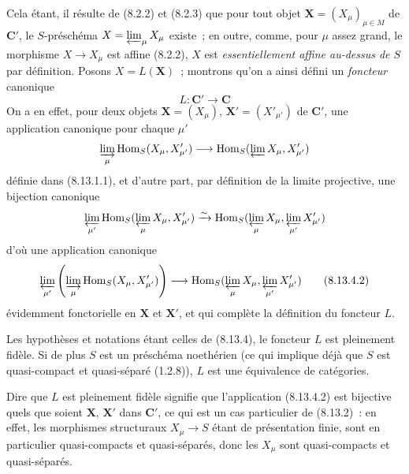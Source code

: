 \begin{env}[8.13.4]
Cela étant, il résulte de (8.2.2) et (8.2.3) que pour tout objet
$\mathbf X=(X_\mu)_{\mu\in M}$ de $\boldsymbol{C}'$, le $S$-préschéma
$X=\varprojlim_\mu X_\mu$ existe~; en outre, comme, pour $\mu$ assez grand,
le morphisme $X\to X_\mu$ est affine (8.2.2), $X$ est
\emph{essentiellement affine au-dessus de $S$} par définition. Posons
$X=L(\mathbf X)$~; montrons qu'on a ainsi défini un \emph{foncteur} canonique
\begin{equation}
\label{IV.8.13.4.1-fr}
L:\boldsymbol{C}'\longrightarrow\boldsymbol{C} \tag{8.13.4.1}
\end{equation}
On a en effet, pour deux objets $\mathbf X=(X_\mu)$,
$\mathbf X'=(X'_{\mu'})$ de $\boldsymbol{C}'$, une application canonique pour
chaque $\mu'$
\[
\varinjlim_\mu\operatorname{Hom}_S(X_\mu,X'_{\mu'})
\longrightarrow
\operatorname{Hom}_S(\varprojlim X_\mu,X'_{\mu'})
\]
définie dans (8.13.1.1), et d'autre part, par définition de la limite
projective, une bijection canonique
\[
\varprojlim_{\mu'}
\operatorname{Hom}_S(\varprojlim_\mu X_\mu,X'_{\mu'})
\xrightarrow{\sim}
\operatorname{Hom}_S(\varprojlim_\mu X_\mu,
\varprojlim_{\mu'}X'_{\mu'})
\]
d'où une application canonique
\begin{equation}
\label{IV.8.13.4.2-fr}
\varprojlim_{\mu'}\left(\varinjlim_\mu
\operatorname{Hom}_S(X_\mu,X'_{\mu'})\right)
\longrightarrow
\operatorname{Hom}_S(\varprojlim_\mu X_\mu,
\varprojlim_{\mu'}X'_{\mu'}) \tag{8.13.4.2}
\end{equation}
évidemment fonctorielle en $\mathbf X$ et $\mathbf X'$, et qui complète la
définition du foncteur $L$.
\end{env}

\begin{proposition}[8.13.5]
\label{IV.8.13.5-fr}
Les hypothèses et notations étant celles de \textup{(8.13.4)}, le foncteur $L$ est
pleinement fidèle. Si de plus $S$ est un préschéma noethérien \textup{(ce qui implique
déjà que $S$ est quasi-compact et quasi-séparé (1.2.8))}, $L$ est une
équivalence de catégories.
\end{proposition}

Dire que $L$ est pleinement fidèle signifie que l'application (8.13.4.2) est
bijective quels que soient $\mathbf X$, $\mathbf X'$ dans $\boldsymbol{C}'$, ce
qui est un cas particulier de (8.13.2)~: en effet, les morphismes structuraux
$X_\mu\to S$ étant de présentation finie, sont en particulier quasi-compacts
et quasi-séparés, donc les $X_\mu$ sont quasi-compacts et quasi-séparés.

